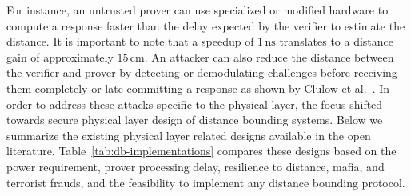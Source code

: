 \documentclass{sig-alternate-10pt}
\newcommand{\unit}[1]{\ensuremath{\, \mathrm{#1}}}
\begin{document}
For instance, an untrusted prover can use specialized or modified hardware to
compute a response faster than the delay expected by the verifier to estimate
the distance. It is important to note that a speedup of $1\unit{ns}$ translates
to a distance gain of approximately $15\unit{cm}$. An attacker can also reduce
the distance between the verifier and prover by detecting or demodulating
challenges before receiving them completely or late committing a response as
shown by Clulow et al.~\cite{ClulowSep06}. In order to address these attacks
specific to the physical layer, the focus shifted towards secure physical layer
design of distance bounding systems. Below we summarize the existing
physical layer related designs available in the open literature.
Table~\ref{tab:db-implementations} compares these designs based on the power
requirement, prover processing delay, resilience to distance, mafia, and
terrorist frauds, and the feasibility to implement any distance bounding
protocol.
\end{document}
